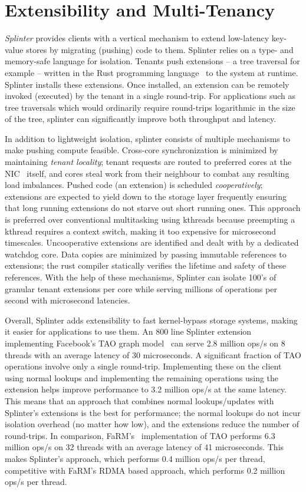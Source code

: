 \section{Extensibility and Multi-Tenancy}

\emph{Splinter} provides clients with a vertical mechanism
to extend low-latency key-value stores by migrating (pushing) code to them.
%
Splinter relies on a type- and memory-safe language for isolation.
%
Tenants push
extensions – a tree traversal for example – written in the Rust
programming language~\cite{rust} to the system at runtime.
%
Splinter installs
these extensions.
%
Once installed, an extension can
be remotely invoked (executed) by the tenant in a
single round-trip.
%
For applications such as tree traversals which would ordinarily require
round-trips logarithmic in the size of the tree, splinter can
significantly improve both throughput and latency.

In addition to lightweight isolation, splinter consists of multiple
mechanisms to make pushing compute feasible.
%
Cross-core synchronization
is minimized by maintaining \emph{tenant locality}; tenant requests are
routed
to preferred cores at the NIC~\cite{flow-director} itself, and cores
steal work from
their neighbour to combat any resulting load imbalances.
%
Pushed code (an extension) is scheduled \emph{cooperatively}; extensions are
expected to yield down to the storage layer frequently ensuring that
long running extensions do not starve out short running ones.
%
This
approach is preferred over conventional multitasking using kthreads
because preempting a kthread requires a context switch, making it too
expensive for microsecond timescales.
%
Uncooperative extensions are
identified and dealt with by a dedicated watchdog core.
%
Data copies are
minimized by passing immutable references to extensions; the rust
compiler statically verifies the lifetime and safety of these
references.
%
With the help of these mechanisms, Splinter can isolate
100’s of granular tenant extensions per core while serving millions of
operations per second with microsecond latencies.

Overall, Splinter adds extensibility to fast kernel-bypass storage
systems, making it easier for applications to use them.
%
An 800 line Splinter extension implementing Facebook’s TAO graph
model~\cite{tao-2013}
can serve 2.8 million ops/s on 8 threads with an average latency of
30 microseconds.
%
A significant fraction of TAO operations involve only a single
round-trip.
%
Implementing these on the client using normal lookups and
implementing the remaining operations using the extension helps improve
performance to 3.2 million ops/s at the same latency.
%
This means that an
approach that combines normal lookups/updates with Splinter’s extensions
is the best for performance; the normal lookups do not incur isolation
overhead (no matter how low), and the extensions reduce the number of
round-trips.
%
In comparison, FaRM’s~\cite{farm-2014} implementation of TAO performs
6.3 million
ops/s on 32 threads with an average latency of 41 microseconds.
%
This
makes Splinter’s approach, which performs 0.4 million ops/s per thread,
competitive with FaRM’s RDMA based approach, which performs 0.2 million
ops/s per thread.
